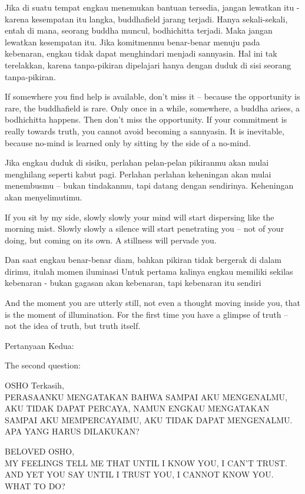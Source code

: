 \bahasa
Jika di suatu tempat engkau menemukan bantuan tersedia, jangan lewatkan itu - karena kesempatan itu langka, buddhafield jarang terjadi. Hanya sekali-sekali, entah di mana, seorang buddha muncul, bodhichitta terjadi. Maka jangan lewatkan kesempatan itu. Jika komitmenmu benar-benar menuju pada kebenaran, engkau tidak dapat menghindari menjadi sannyasin. Hal ini tak terelakkan, karena tanpa-pikiran dipelajari hanya dengan duduk di sisi seorang tanpa-pikiran.

\english
If somewhere you find help is available, don't miss it -- because the opportunity is rare, the buddhafield is rare. Only once in a while, somewhere, a buddha arises, a bodhichitta happens. Then don't miss the opportunity. If your commitment is really towards truth, you cannot avoid becoming a sannyasin. It is inevitable, because no-mind is learned only by sitting by the side of a no-mind.

\bahasa
Jika engkau duduk di sisiku, perlahan pelan-pelan pikiranmu akan mulai menghilang seperti kabut pagi. Perlahan perlahan keheningan akan mulai menembusmu -- bukan tindakanmu, tapi datang dengan sendirinya. Keheningan akan menyelimutimu.

\english
If you sit by my side, slowly slowly your mind will start dispersing like the morning mist. Slowly slowly a silence will start penetrating you -- not of your doing, but coming on its own. A stillness will pervade you.

\bahasa
Dan saat engkau benar-benar diam, bahkan pikiran tidak bergerak di dalam dirimu, itulah momen iluminasi Untuk pertama kalinya engkau memiliki sekilas kebenaran - bukan gagasan akan kebenaran, tapi kebenaran itu sendiri

\english
And the moment you are utterly still, not even a thought moving inside you, that is the moment of illumination. For the first time you have a glimpse of truth -- not the idea of truth, but truth itself.

\bahasa
Pertanyaan Kedua:

\english
The second question:

\bahasa
OSHO Terkasih,\\
PERASAANKU MENGATAKAN BAHWA SAMPAI AKU MENGENALMU, AKU TIDAK DAPAT PERCAYA, NAMUN ENGKAU MENGATAKAN SAMPAI AKU MEMPERCAYAIMU, AKU TIDAK DAPAT MENGENALMU. APA YANG HARUS DILAKUKAN?

\english
BELOVED OSHO,\\
MY FEELINGS TELL ME THAT UNTIL I KNOW YOU, I CAN'T TRUST. AND YET YOU SAY UNTIL I TRUST YOU, I CANNOT KNOW YOU. WHAT TO DO?


